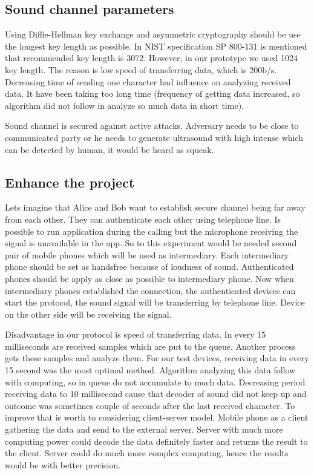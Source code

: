 \documentclass[11pt,titlepage]{article}
\theoremstyle{plain}
\begin{document}
\subsection{Sound channel parameters}

Using Diffie-Hellman key exchange and asymmetric cryptography should be use the longest key length as possible. In NIST specification SP 800-131 is mentioned that recommended key length is 3072. However, in our prototype we used 1024 key length. The reason is low speed of transferring data, which is 200b/s. Decreasing time of sending one character had influence on analyzing received data. It have been taking too long time (frequency of getting data increased, so algorithm did not follow in analyze so much data in short time).

\vspace{5mm}

Sound channel is secured against active attacks. Adversary needs to be close to communicated party or he needs to generate ultrasound with high intense which can be detected by human, it would be heard as squeak.

\subsection{Enhance the project}
Lets imagine that Alice and Bob want to establish secure channel being far away from each other. They can authenticate each other using telephone line. Is possible to run application during the calling but the microphone receiving the signal is unavailable in the app. So to this experiment would be needed second pair of mobile phones which will be used as intermediary. Each intermediary phone should be set as handsfree because of loudness of sound. Authenticated phones should be apply as close as possible to intermediary phone. Now when intermediary phones established the connection, the authenticated devices can start the protocol, the sound signal will be transferring by telephone line. Device on the other side will be receiving the signal. 

\vspace{5mm}

Disadvantage in our protocol is speed of transferring data. In every 15 milliseconds are received samples which are put to the queue. Another process gets these samples and analyze them. For our test devices, receiving data in every 15 second was the most optimal method. Algorithm analyzing this data follow with computing, so in queue do not accumulate to much data. Decreasing period receiving data to 10 millisecond cause that decoder of sound did not keep up and outcome was sometimes couple of seconds after the last received character. To improve that is worth to considering client-server model. Mobile phone as a client gathering the data and send to the external server. Server with much more computing power could decode the data definitely faster and returns the result to the client. Server could do much more complex computing, hence the results would be with better precision.
\end{document}

